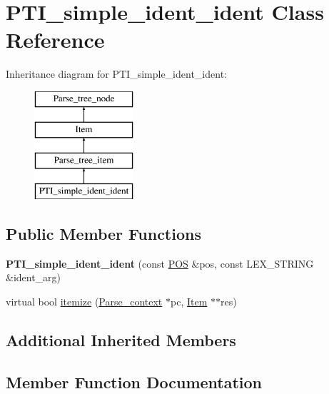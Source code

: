 \hypertarget{classPTI__simple__ident__ident}{}\section{P\+T\+I\+\_\+simple\+\_\+ident\+\_\+ident Class Reference}
\label{classPTI__simple__ident__ident}
Inheritance diagram for P\+T\+I\+\_\+simple\+\_\+ident\+\_\+ident\+:\begin{figure}[H]
\begin{center}
\leavevmode
\includegraphics[height=4.000000cm]{classPTI__simple__ident__ident}
\end{center}
\end{figure}
\subsection*{Public Member Functions}
\begin{DoxyCompactItemize}
\item 
\mbox{\label{classPTI__simple__ident__ident_a0a409bba1f569cbf416514aebd8bebf7}} 
{\bfseries P\+T\+I\+\_\+simple\+\_\+ident\+\_\+ident} (const \mbox{\hyperlink{structYYLTYPE}{P\+OS}} \&pos, const L\+E\+X\+\_\+\+S\+T\+R\+I\+NG \&ident\+\_\+arg)
\item 
virtual bool \mbox{\hyperlink{classPTI__simple__ident__ident_ae9ddbaf6e11a794be2f831c7b8321e86}{itemize}} (\mbox{\hyperlink{structParse__context}{Parse\+\_\+context}} $\ast$pc, \mbox{\hyperlink{classItem}{Item}} $\ast$$\ast$res)
\end{DoxyCompactItemize}
\subsection*{Additional Inherited Members}


\subsection{Member Function Documentation}
\mbox{\label{classPTI__simple__ident__ident_ae9ddbaf6e11a794be2f831c7b8321e86}} 
